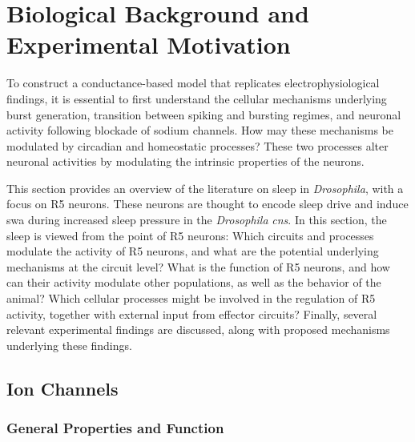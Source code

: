 \documentclass[../main.tex]{subfiles}
\begin{document}

\section{Biological Background and Experimental Motivation} \label{sec:sleep_and_r5_network}


To construct a conductance-based model that replicates electrophysiological findings, it is essential to first understand the cellular mechanisms underlying burst generation, transition between spiking and bursting regimes, and neuronal activity following blockade of sodium channels.
How may these mechanisms be modulated by circadian and homeostatic processes?
These two processes alter neuronal activities by modulating the intrinsic properties
of the neurons.

This section provides an overview of the literature on sleep in \textit{Drosophila}, with a focus on R5 neurons. These neurons are thought to encode sleep drive and induce \gls{swa} during increased sleep pressure in the \textit{Drosophila}
\textit{cns}. In this section, the sleep is viewed from the point of R5 neurons: Which circuits and processes modulate the activity of R5 neurons, and what are the potential underlying mechanisms at the circuit level? What is the function of R5 neurons, and how can their activity modulate other populations, as well as the behavior of the animal? Which cellular processes might be involved in the regulation of R5 activity, together with external input from effector circuits? Finally, several relevant experimental findings are discussed, along with proposed mechanisms underlying these findings.


\subsection{Ion Channels}
\subsubsection{General Properties and Function}\label{subsubsec:ion_channel_properties_and_function}
\end{document}
